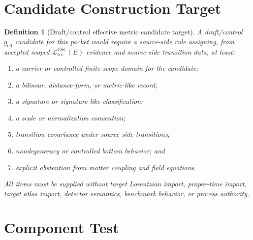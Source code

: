 \documentclass[11pt]{article}
\newcommand{\MetricData}{\mathcal{L}_{\mathrm{src}}^{\mathsf{GSC}}}
\newcommand{\geff}{g_{\mathrm{eff}}}
\newtheorem{definition}{Definition}
\begin{document}
\section{Candidate Construction Target}

\begin{definition}[Draft/control effective metric candidate target]
A draft/control \(\geff\) candidate for this packet would require a
source-side rule assigning, from accepted scoped \(\MetricData(E)\) evidence
and source-side transition data, at least:
\begin{enumerate}[leftmargin=*]
  \item a carrier or controlled finite-scope domain for the candidate;
  \item a bilinear, distance-form, or metric-like record;
  \item a signature or signature-like classification;
  \item a scale or normalization convention;
  \item transition covariance under source-side transitions;
  \item nondegeneracy or controlled bottom behavior; and
  \item explicit abstention from matter coupling and field equations.
\end{enumerate}
All items must be supplied without target Lorentzian import, proper-time
import, target atlas import, detector semantics, benchmark behavior, or
process authority.
\end{definition}

\section{Component Test}
\end{document}
